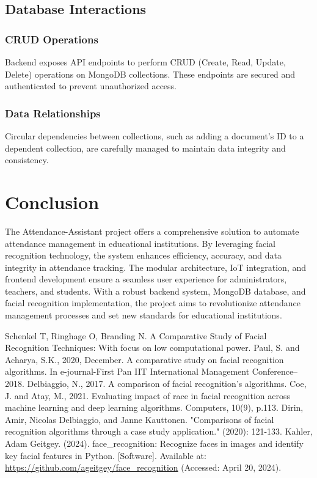 \documentclass[conference]{IEEEtran}
\begin{document}
\subsection{Database Interactions}
\subsubsection{CRUD Operations}
Backend exposes API endpoints to perform CRUD (Create, Read, Update, Delete) operations on MongoDB collections. These endpoints are secured and authenticated to prevent unauthorized access.

\subsubsection{Data Relationships}
Circular dependencies between collections, such as adding a document's ID to a dependent collection, are carefully managed to maintain data integrity and consistency.

\section{Conclusion}
The Attendance-Assistant project offers a comprehensive solution to automate attendance management in educational institutions. By leveraging facial recognition technology, the system enhances efficiency, accuracy, and data integrity in attendance tracking. The modular architecture, IoT integration, and frontend development ensure a seamless user experience for administrators, teachers, and students. With a robust backend system, MongoDB database, and facial recognition implementation, the project aims to revolutionize attendance management processes and set new standards for educational institutions.

\begin{thebibliography}{00}
    Schenkel T, Ringhage O, Branding N. A Comparative Study of Facial Recognition Techniques: With focus on low computational power.
    Paul, S. and Acharya, S.K., 2020, December. A comparative study on facial recognition algorithms. In e-journal-First Pan IIT International Management Conference–2018.
    Delbiaggio, N., 2017. A comparison of facial recognition’s algorithms.
    Coe, J. and Atay, M., 2021. Evaluating impact of race in facial recognition across machine learning and deep learning algorithms. Computers, 10(9), p.113.
    Dirin, Amir, Nicolas Delbiaggio, and Janne Kauttonen. "Comparisons of facial recognition algorithms through a case study application." (2020): 121-133.
    Kahler, Adam Geitgey. (2024). face\_recognition: Recognize faces in images and identify key facial features in Python. [Software]. Available at: \url{https://github.com/ageitgey/face_recognition} (Accessed: April 20, 2024).

\end{thebibliography}
\end{document}
